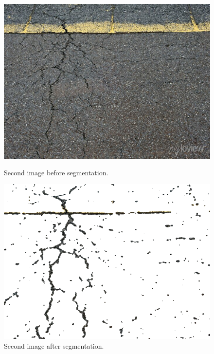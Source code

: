 \begin{figure}[h]
	\centering
	\begin{minipage}{0.45\textwidth}
		\centering
		\includegraphics[width=\linewidth]{images/source/original/2}
		\caption{Second image before segmentation.}
		\label{fig:1c}
        \end{minipage}
        \hspace{0.05\textwidth}
        \begin{minipage}{0.45\textwidth}
        		\centering
		\includegraphics[width=\linewidth]{images/source/task1/2}
		\caption{Second image after segmentation.}
		\label{fig:1d}
        \end{minipage}
\end{figure}


